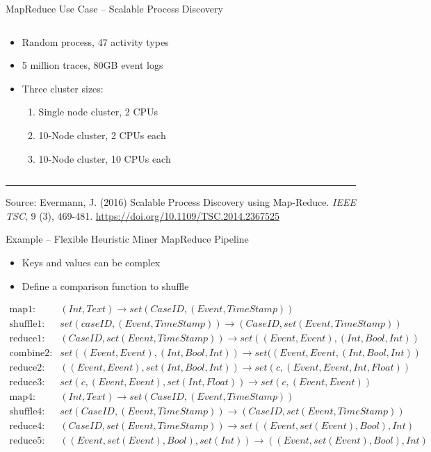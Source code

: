 \documentclass[ignorenonframetext,xcolor=x11names]{beamer}
\begin{document}
\begin{frame}{MapReduce Use Case -- Scalable Process Discovery}
\begin{columns}
\begin{column}{.7\textwidth}
\begin{itemize}
  \item Random process, 47 activity types
  \item 5 million traces, 80GB event logs
  \item Three cluster sizes:
  \begin{enumerate}
     \item Single node cluster, 2 CPUs
     \item 10-Node cluster, 2 CPUs each
     \item 10-Node cluster, 10 CPUs each
  \end{enumerate}
\end{itemize}
\end{column}
\end{columns}

\vspace{\baselineskip}
\hrule

\small 
\vspace{\baselineskip}
Source: Evermann, J. (2016) Scalable Process Discovery using Map-Reduce. \emph{IEEE TSC}, 9 (3), 469-481. \footnotesize \url{https://doi.org/10.1109/TSC.2014.2367525}
\end{frame}

\begin{frame}{Example -- Flexible Heuristic Miner MapReduce Pipeline}

\begin{itemize}
\item Keys and values can be complex
\item Define a comparison function to shuffle
\end{itemize}
\footnotesize
\begin{align*}
\text{map1:} &(Int, Text) \rightarrow set(CaseID, (Event, TimeStamp)) \\
\text{shuffle1:} &set(caseID, (Event, TimeStamp)) \rightarrow (CaseID, set(Event, TimeStamp)) \\
\text{reduce1:}  &(CaseID, set(Event, TimeStamp)) \rightarrow set((Event, Event), (Int, Bool, Int)) \\
\text{combine2:} &set((Event, Event), (Int, Bool, Int)) \rightarrow set((Event, Event, (Int, Bool, Int)) \\
\text{reduce2:}   &((Event, Event), set(Int, Bool, Int)) \rightarrow set(c, (Event, Event, Int, Float)) \\
\text{reduce3:}  & set(c, (Event, Event), set(Int, Float)) \rightarrow set(c, (Event, Event)) \\
\text{map4:}     & (Int, Text) \rightarrow set(CaseID, (Event, TimeStamp)) \\
\text{shuffle4:} & set(CaseID, (Event, TimeStamp)) \rightarrow (CaseID, set(Event, TimeStamp)) \\
\text{reduce4:}  & (CaseID, set(Event, TimeStamp)) \rightarrow set((Event, set(Event), Bool), Int) \\
\text{reduce5:}  & ((Event, set(Event), Bool), set(Int)) \rightarrow ((Event, set(Event), Bool), Int) 
\end{align*}
\end{frame}
\end{document}
